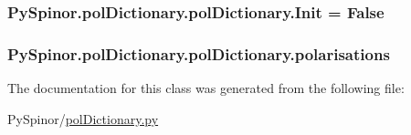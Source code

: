 \subsubsection[{Init}]{\setlength{\rightskip}{0pt plus 5cm}Py\+Spinor.\+pol\+Dictionary.\+pol\+Dictionary.\+Init = False\hspace{0.3cm}{\ttfamily [static]}}\label{class_py_spinor_1_1pol_dictionary_1_1pol_dictionary_aa8533ad7b225385b3d7463ff598a594a}
\hypertarget{class_py_spinor_1_1pol_dictionary_1_1pol_dictionary_a4af4ee4e42c9fc945e688e94afc69222}{}
\subsubsection[{polarisations}]{\setlength{\rightskip}{0pt plus 5cm}Py\+Spinor.\+pol\+Dictionary.\+pol\+Dictionary.\+polarisations}\label{class_py_spinor_1_1pol_dictionary_1_1pol_dictionary_a4af4ee4e42c9fc945e688e94afc69222}


The documentation for this class was generated from the following file\+:\begin{DoxyCompactItemize}
\item 
Py\+Spinor/\hyperlink{pol_dictionary_8py}{pol\+Dictionary.\+py}\end{DoxyCompactItemize}
